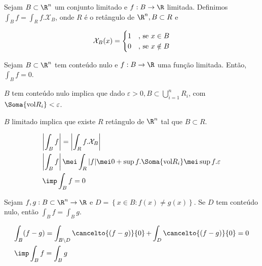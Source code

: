 \documentclass{book}
\begin{document}
\begin{defn}
Sejam $B \subset \R^n$ um conjunto limitado e $f:B \to \R$ limitada. Definimos $\int_B f = \int_R f.\mathcal{X}_B$, onde $R$ \'e o ret\^angulo de $\R^n, B \subset R$ e

\begin{equation*}
  \mathcal{X}_B (x) =
  \begin{cases}
    \hfill 1 	& \mbox{, se } x \in B \\
    \hfill 0 	& \mbox{, se } x \notin B
  \end{cases}
\end{equation*}
\end{defn}

\begin{prop}
Sejam $B \subset \R^n$ tem conte\'udo nulo e $f:B \to \R$ uma fun\c c\~ao limitada. Ent\~ao, $\int_B f = 0$.
\end{prop}

\begin{dem}
$B$ tem conte\'udo nulo implica que dado $\varepsilon > 0, B \subset \bigcup\limits_{i = 1}^n {R_i }$, com $\Soma{\text{vol}R_i} < \varepsilon$.

$B$ limitado implica que existe $R$ ret\^angulo de $\R^n$ tal que $B \subset R$.

\[
\begin{gathered}
  \left| {\int_B f} \right| = \left| {\int_R f.\mathcal{X}_B} \right| \hfill \\
  \left| {\int_B f} \right| \mei \int_R |f| \mei 0 + \sup f. \Soma{\text{vol}R_i} \mei \sup f. \varepsilon \hfill \\
  \imp \int_B f = 0 \hfill
\end{gathered} 
\]

\end{dem}

\begin{cor}
Sejam $f,g: B \subset \R^n \to \R$ e $D = \left\{ {x \in B:f(x) \ne g(x)} \right\}$. Se $D$ tem conte\'udo nulo, ent\~ao $\int_B f = \int_B g$.
\end{cor}

\begin{dem}

\[
\begin{gathered}
  \int_B (f-g) = \int_{B \setminus D} \mathop {\cancelto{\left( f-g \right)}{0}} + \int_D \mathop {\cancelto{\left( f-g \right)}{0}} = 0 \hfill \\
  \imp \int_B f = \int_B g \hfill \\ 
\end{gathered} 
\]

\end{dem}
\end{document}
